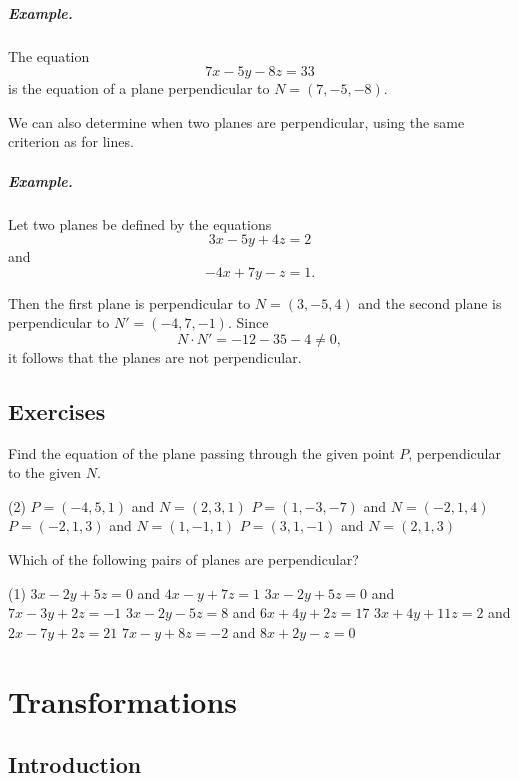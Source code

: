 \documentclass[12pt]{book} %
\begin{document}
\begin{ExerciseList}
\paragraph{Example.}
The equation
\[
7x-5y-8z=33
\]
is the equation of a plane perpendicular to $N=(7,-5,-8)$.

We can also determine when two planes are perpendicular, using the same criterion as for lines.

\paragraph{Example.}
Let two planes be defined by the equations
\[
3x-5y+4z=2
\]
and
\[
-4x+7y-z=1.
\]

Then the first plane is perpendicular to $N=(3,-5,4)$ and the second plane is perpendicular to $N'=(-4,7,-1)$. Since
\[
N\cdot N'=-12-35-4\ne 0,
\]
it follows that the planes are not perpendicular.

\section*{Exercises}

\setcounter{Exercise}{0}
\begin{ExerciseList}
\Exercise Find the equation of the plane passing through the given point $P$, perpendicular to the given $N$.
\begin{tasks}(2)
\task[(a)] $P=(-4,5,1)$ and $N=(2,3,1)$
\task[(b)] $P=(1,-3,-7)$ and $N=(-2,1,4)$
\task[(c)] $P=(-2,1,3)$ and $N=(1,-1,1)$
\task[(d)] $P=(3,1,-1)$ and $N=(2,1,3)$
\end{tasks}

\Exercise Which of the following pairs of planes are perpendicular?
\begin{tasks}(1)
\task[(a)] $3x-2y+5z=0$ and $4x-y+7z=1$
\task[(b)] $3x-2y+5z=0$ and $7x-3y+2z=-1$
\task[(c)] $3x-2y-5z=8$ and $6x+4y+2z=17$
\task[(d)] $3x+4y+11z=2$ and $2x-7y+2z=21$
\task[(e)] $7x-y+8z=-2$ and $8x+2y-z=0$
\end{tasks}
\end{ExerciseList}

\chapter{Transformations}

\section{Introduction}


\end{ExerciseList}
\end{document}
